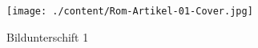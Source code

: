 \begin{refsection}
\begin{figure}[t]
  \begin{center}
  \texttt{[image: ./content/Rom-Artikel-01-Cover.jpg]}
  \caption{Bildunterschift 1}\label{fig:label1}		%
  \end{center}
\end{figure}

% 
\printbibliography
\end{refsection}


